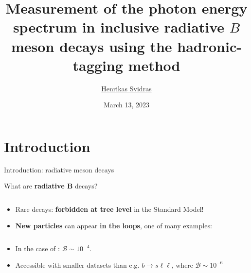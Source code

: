 \documentclass[xcolor=dvipsnames]{beamer}
\title[\meeting]{Measurement of the photon energy spectrum in
inclusive radiative \texorpdfstring{$B$}{B} meson decays using the
hadronic-tagging method} %
\author[Henrikas Svidras]{\texorpdfstring{\footnotesize \underline{Henrikas Svidras}}{Henrikas Svidras}} %
\institute[DESY] %
{
\text{\large \meeting}
\vspace{-10pt}
}
\date{March 13, 2023} %
\begin{document}
{ 
\begin{frame}
\titlepage %
\end{frame}
}
\addtocounter{framenumber}{-1}

\section{Introduction}
\begin{frame}{Introduction: radiative \safeB meson decays}
\centering\scriptsize
{\normalsize What are \textbf{radiative $\bm{B}$} decays?
\begin{columns}
   
   
\end{columns}
}

\begin{itemize}
   \item Rare decays: \textbf{forbidden at tree level} in the Standard Model!
   \item \textbf{New particles} can appear \textbf{in the loops}, one of many examples:
\end{itemize}
{\normalsize
\begin{columns}
   
\end{columns}
}
\begin{itemize}
   \item In the case of \btosgamma: $\mathcal{B}\sim10^{-4}$.
   \item[\ra] Accessible with smaller datasets than e.g. $b\to s\ell\ell$, where $\mathcal{B}\sim10^{-6}$
\end{itemize}

\end{frame}
\end{document}
